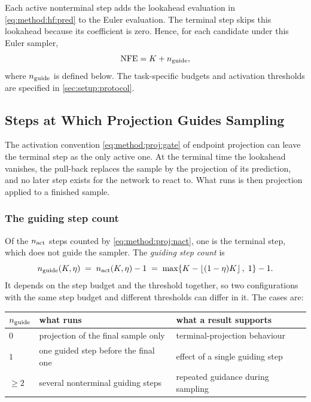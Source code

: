 Each active nonterminal step adds the lookahead evaluation in \eqref{eq:method:hf:pred} to the
Euler evaluation. The terminal step skips this lookahead because its coefficient is zero. Hence,
for each candidate under this Euler sampler,
\begin{equation}\label{eq:method:hf:nfe}
  \mathrm{NFE}=K+n_{\textrm{guide}},
\end{equation}
where $n_{\textrm{guide}}$ is defined below. The task-specific budgets and activation thresholds are
specified in \autoref{sec:setup:protocol}.

\subsection{Steps at Which Projection Guides Sampling}\label{sec:method:degenerate}

The activation convention \eqref{eq:method:proj:gate} of endpoint projection can leave the terminal step
as the only active one. At the terminal time the lookahead vanishes, the pull-back replaces the sample
by the projection of its prediction, and no later step exists for the network to react to. What runs is
then projection applied to a finished sample.

\subsubsection*{The guiding step count}

Of the $n_{\textrm{act}}$ steps counted by \eqref{eq:method:proj:nact}, one is the terminal step, which does
not guide the sampler. The \emph{guiding step count} is
\begin{equation}\label{eq:method:degen:ngen}
  n_{\textrm{guide}}(K,\eta)
  \;=\; n_{\textrm{act}}(K,\eta) - 1
  \;=\; \max\!\left\{K - \left\lfloor(1-\eta)K\right\rfloor,\;1\right\} - 1 .
\end{equation}
It depends on the step budget and the threshold together, so two configurations with the same step
budget and different thresholds can differ in it. The cases are:

\begin{center}
\begin{tabularx}{\linewidth}{lLL}
  \toprule
  $n_{\textrm{guide}}$ & what runs & what a result supports \\
  \midrule
  $0$     & projection of the final sample only        & terminal-projection behaviour \\
  $1$     & one guided step before the final one       & effect of a single guiding step \\
  $\ge 2$ & several nonterminal guiding steps          & repeated guidance during sampling \\
  \bottomrule
\end{tabularx}
\end{center}

